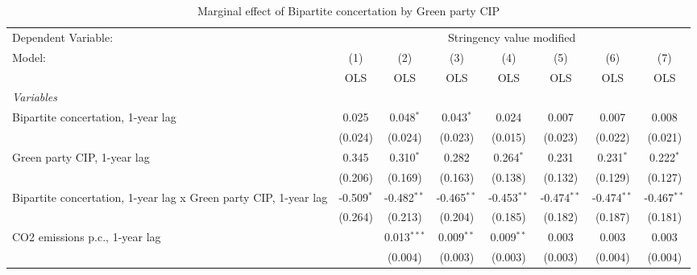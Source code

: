 
\begin{table}[htbp]
   \caption{Marginal effect of Bipartite concertation by Green party CIP}
   \centering
   \begin{tabular}{lccccccc}
      \toprule
      Dependent Variable: & \multicolumn{7}{c}{Stringency value modified}\\
      Model:                                                           & (1)          & (2)           & (3)           & (4)           & (5)           & (6)           & (7)\\  
                                                                       &  OLS         & OLS           & OLS           & OLS           & OLS           & OLS           & OLS\\  
      \midrule
      \emph{Variables}\\
      Bipartite concertation, 1-year lag                               & 0.025        & 0.048$^{*}$   & 0.043$^{*}$   & 0.024         & 0.007         & 0.007         & 0.008\\   
                                                                       & (0.024)      & (0.024)       & (0.023)       & (0.015)       & (0.023)       & (0.022)       & (0.021)\\   
      Green party CIP, 1-year lag                                      & 0.345        & 0.310$^{*}$   & 0.282         & 0.264$^{*}$   & 0.231         & 0.231$^{*}$   & 0.222$^{*}$\\   
                                                                       & (0.206)      & (0.169)       & (0.163)       & (0.138)       & (0.132)       & (0.129)       & (0.127)\\   
      Bipartite concertation, 1-year lag x Green party CIP, 1-year lag & -0.509$^{*}$ & -0.482$^{**}$ & -0.465$^{**}$ & -0.453$^{**}$ & -0.474$^{**}$ & -0.474$^{**}$ & -0.467$^{**}$\\   
                                                                       & (0.264)      & (0.213)       & (0.204)       & (0.185)       & (0.182)       & (0.187)       & (0.181)\\   
      CO2 emissions p.c., 1-year lag                                   &              & 0.013$^{***}$ & 0.009$^{**}$  & 0.009$^{**}$  & 0.003         & 0.003         & 0.003\\   
                                                                       &              & (0.004)       & (0.003)       & (0.003)       & (0.003)       & (0.004)       & (0.004)\\   

\end{tabular}
\end{table}
